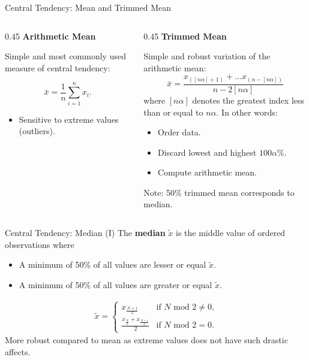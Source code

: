 \begin{frame}{Central Tendency: Mean and Trimmed Mean}
	\begin{columns}
		\begin{column}{0.45\textwidth}
			\textbf{Arithmetic Mean}

			Simple and most commonly used measure of central tendency:

			\begin{equation*}
				\bar{x} = \frac{1}{n} \sum_{i=1}^{n} x_i.
			\end{equation*}

			\begin{itemize}
				\item Sensitive to extreme values (outliers).
			\end{itemize}
		\end{column}
		\begin{column}{0.45\textwidth}
			\textbf{Trimmed Mean}

			Simple and robust variation of the arithmetic mean:
			\begin{equation*}
				\bar{x} = \frac{x_{([n\alpha]+1)}+ \dots x_{(n-[n\alpha])}}{n-2[n\alpha]}
			\end{equation*}
			where $[n\alpha]$ denotes the greatest index less than or equal to $n\alpha$. In other words:

			\begin{itemize}
				\item Order data.
				\item Discard lowest and highest $100\alpha\%$.
				\item Compute arithmetic mean.
			\end{itemize}


			Note: 50\% trimmed mean corresponds to median.
		\end{column}
	\end{columns}
\end{frame}

\begin{frame}{Central Tendency: Median (I)}
	The \textbf{median} $\tilde{x}$ is the middle value of ordered observations where
	\begin{itemize}
		\item A minimum of 50\% of all values are lesser or equal $\tilde{x}$.
		\item A minimum of 50\% of all values are greater or equal $\tilde{x}$.
	\end{itemize}

	\begin{align*}
		\tilde{x} = %
		\begin{cases}
			x_{\frac{N+1}{2}}                           & \text{if $N$ mod $2 \neq 0$,} \\
			\frac{x_{\frac{N}{2}}+x_{\frac{N+1}{2}}}{2} & \text{if $N$ mod $2 = 0$.}
		\end{cases}
	\end{align*}
	More robust compared to mean as extreme values does not have such drastic affects.
\end{frame}

